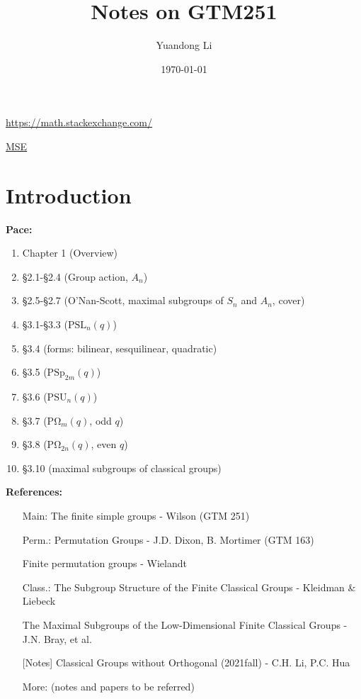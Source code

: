 \documentclass[a4,11pt]{article}
\title{Notes on GTM251}
\author{Yuandong Li}
\date{\today}
\def\PSL{\mathrm{PSL}}
\def\PSU{\mathrm{PSU}}
\def\PSp{\mathrm{PSp}}
\def\PO{\mathrm{P\Omega}}
\def\PSL{\mathrm{PSL}}
\begin{document}
\maketitle

\tableofcontents
\newpage

\url{https://math.stackexchange.com/}

\href{https://math.stackexchange.com/}{MSE}

\section{Introduction}
\textbf{Pace: }
\begin{enumerate}[Lesson 1:]
	\item Chapter 1 (Overview)
	\item \S 2.1-\S 2.4 (Group action, $A_n$)
	\item \S 2.5-\S 2.7 (O'Nan-Scott, maximal subgroups of $S_n$ and $A_n$, cover)
	\item \S 3.1-\S 3.3 ($\PSL_n(q)$)
	\item \S 3.4 (forms: bilinear, sesquilinear, quadratic)
	\item \S 3.5 ($\PSp_{2m}(q)$)
	\item \S 3.6 ($\PSU_n(q)$)
	\item \S 3.7 ($\PO_{m}(q)$, odd $q$)
	\item \S 3.8 ($\PO_{2n}(q)$, even $q$)
	\item \S 3.10 (maximal subgroups of classical groups)
\end{enumerate}

\vline 

\noindent \textbf{References:}
\begin{itemize}
	\item[Main:] The finite simple groups - Wilson (GTM 251)
	\item[Perm.:] Permutation Groups - J.D. Dixon, B. Mortimer (GTM 163)
	\item[ ] Finite permutation groups - Wielandt
	\item[Class.:] The Subgroup Structure of the Finite Classical Groups - Kleidman \& Liebeck
	\item[ ] The Maximal Subgroups of the Low-Dimensional Finite Classical Groups - J.N. Bray, et al.
		\item[ ] [Notes] Classical Groups without Orthogonal (2021fall) - C.H. Li, P.C. Hua
	\item[More:] (notes and papers to be referred)
	\item[ ]
\end{itemize}
\end{document}
